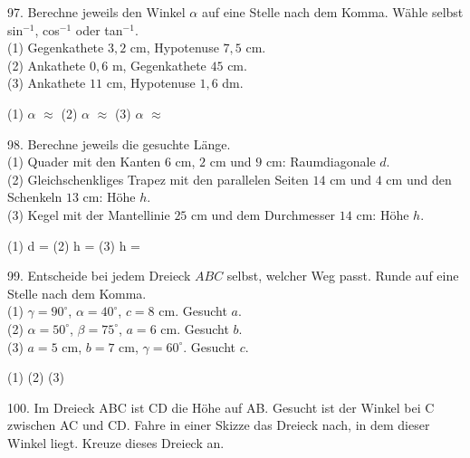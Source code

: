 \documentclass[11pt]{article}
\begin{document}
\pfgruppe{}
\begin{pfaufg}{}{97.}{}
Berechne jeweils den Winkel $\alpha$ auf eine Stelle nach dem Komma. Wähle selbst sin$^{-1}$, cos$^{-1}$ oder tan$^{-1}$.\\ (1) Gegenkathete $3{,}2$ cm, Hypotenuse $7{,}5$ cm.\\ (2) Ankathete $0{,}6$ m, Gegenkathete $45$ cm.\\ (3) Ankathete $11$ cm, Hypotenuse $1{,}6$ dm.
\par\noindent (1) $\alpha$ $\approx$ \leerfeld[°]  (2) $\alpha$ $\approx$ \leerfeld[°]  (3) $\alpha$ $\approx$ \leerfeld[°] \par
{}
\end{pfaufg}
\pfgruppe{}
\begin{pfaufg}{}{98.}{}
Berechne jeweils die gesuchte Länge.\\ (1) Quader mit den Kanten $6$ cm, $2$ cm und $9$ cm: Raumdiagonale $d$.\\ (2) Gleichschenkliges Trapez mit den parallelen Seiten $14$ cm und $4$ cm und den Schenkeln $13$ cm: Höhe $h$.\\ (3) Kegel mit der Mantellinie $25$ cm und dem Durchmesser $14$ cm: Höhe $h$.
\par\noindent (1) d = \leerfeld[cm]  (2) h = \leerfeld[cm]  (3) h = \leerfeld[cm] \par
{}
\end{pfaufg}
\pfgruppe{}
\begin{pfaufg}{}{99.}{}
Entscheide bei jedem Dreieck $ABC$ selbst, welcher Weg passt. Runde auf eine Stelle nach dem Komma.\\ (1) $\gamma = 90^\circ$, $\alpha = 40^\circ$, $c = 8$ cm. Gesucht $a$.\\ (2) $\alpha = 50^\circ$, $\beta = 75^\circ$, $a = 6$ cm. Gesucht $b$.\\ (3) $a = 5$ cm, $b = 7$ cm, $\gamma = 60^\circ$. Gesucht $c$.
\par\noindent (1) \leerfeld[cm]  (2) \leerfeld[cm]  (3) \leerfeld[cm] \par
{}
\end{pfaufg}
\pfgruppe{}
\begin{pfaufg}{}{100.}{}
Im Dreieck ABC ist CD die Höhe auf AB. Gesucht ist der Winkel bei C zwischen AC und CD. Fahre in einer Skizze das Dreieck nach, in dem dieser Winkel liegt. Kreuze dieses Dreieck an. 
\end{pfaufg}
\end{document}
